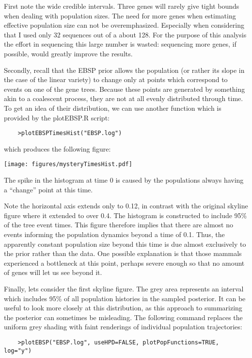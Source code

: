 \documentclass[a4paper,11pt]{article}
\begin{document}
First note the wide credible intervals. Three genes will rarely give tight
bounds when dealing with population sizes. The need for more genes when
estimating effective population size can not be overemphasized. Especially when
considering that I used only 32 sequences out of a about 128. For the purpose
of this analysis the effort in sequencing this large number is wasted:
sequencing more genes, if possible, would greatly improve the results.

Secondly, recall that the EBSP prior allows the population (or rather its
slope in the case of the linear variety) to change only at points which
correspond to events on one of the gene trees.  Because these points are
generated by something akin to a coalescent process, they are not at all evenly
distributed through time.  To get an idea of their distribution, we can use
another function which is provided by the plotEBSP.R script:
\begin{verbatim}
    >plotEBSPTimesHist("EBSP.log")
\end{verbatim}
which produces the following figure:

\texttt{[image: figures/mysteryTimesHist.pdf]}

The spike in the histogram at time 0 is caused by the populations always having
a ``change'' point at this time.

Note the horizontal axis extends only to 0.12, in contrast with the original
skyline figure where it extended to over 0.4.  The histogram is constructed to
include 95\% of the tree event times. This figure therefore implies that there
are almost no events informing the population dynamics beyond a time of 0.1.
Thus, the apparently constant population size beyond this time is due almost
exclusively to the prior rather than the data.  One possible explanation is
that those mammals experienced a bottleneck at this point, perhaps severe
enough so that no amount of genes will let us see beyond it.

Finally, lets consider the first skyline figure. The grey area represents an
interval which includes 95\% of all population histories in the sampled
posterior.  It can be useful to look more closely at this distribution, as this
approach to summarizing the posterior can sometimes be misleading.  The
following command replaces the uniform grey shading with faint renderings of
individual population trajectories:

\begin{verbatim}
    >plotEBSP("EBSP.log", useHPD=FALSE, plotPopFunctions=TRUE, log="y")
\end{verbatim}
\end{document}
